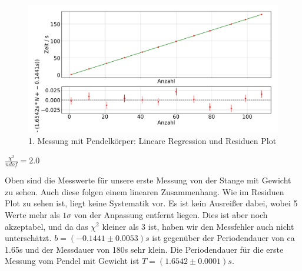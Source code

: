 \documentclass[twoside]{protokoll}
\begin{document}
\begin{figure}[H]
    \centering
    \includegraphics[width=1.0\textwidth]{plots/lineare_regression_gewicht_1.pdf}
    \caption{1. Messung mit Pendelkörper: Lineare Regression und Residuen Plot}
\end{figure}
\begin{center}
    $ \frac{\chi^2}{ndof}  =  2.0$
\end{center}
Oben sind die Messwerte für unsere erste Messung von der Stange mit Gewicht zu sehen.
Auch diese folgen einem linearen Zusammenhang.
Wie im Residuen Plot zu sehen ist, liegt keine Systematik vor.
Es ist kein Ausreißer dabei, wobei 5 Werte mehr als $1\sigma$ von der Anpassung entfernt liegen.
Dies ist aber noch akzeptabel, und da das $\chi^2$ kleiner als 3 ist, haben wir den Messfehler auch nicht unterschätzt.
$b = (-0.1441 \pm 0.0053)s$ ist gegenüber der Periodendauer von ca 1.65s und der Messdauer von 180s sehr klein.
Die Periodendauer für die erste Messung vom Pendel mit Gewicht ist $T = (1.6542 \pm 0.0001)s$.
\end{document}
